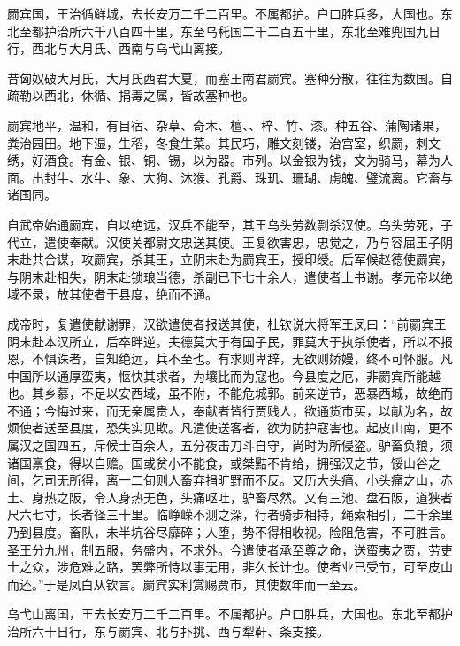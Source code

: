 \documentclass[12pt,UTF8]{ctexbook}
\begin{document}
罽宾国，王治循鲜城，去长安万二千二百里。不属都护。户口胜兵多，大国也。东北至都护治所六千八百四十里，东至乌秅国二千二百五十里，东北至难兜国九日行，西北与大月氏、西南与乌弋山离接。



昔匈奴破大月氏，大月氏西君大夏，而塞王南君罽宾。塞种分散，往往为数国。自疏勒以西北，休循、捐毒之属，皆故塞种也。



罽宾地平，温和，有目宿、杂草、奇木、檀、、梓、竹、漆。种五谷、蒲陶诸果，粪治园田。地下湿，生稻，冬食生菜。其民巧，雕文刻镂，治宫室，织罽，刺文绣，好酒食。有金、银、铜、锡，以为器。市列。以金银为钱，文为骑马，幕为人面。出封牛、水牛、象、大狗、沐猴、孔爵、珠玑、珊瑚、虏魄、璧流离。它畜与诸国同。



自武帝始通罽宾，自以绝远，汉兵不能至，其王乌头劳数剽杀汉使。乌头劳死，子代立，遣使奉献。汉使关都尉文忠送其使。王复欲害忠，忠觉之，乃与容屈王子阴末赴共合谋，攻罽宾，杀其王，立阴末赴为罽宾王，授印绶。后军候赵德使罽宾，与阴末赴相失，阴末赴锁琅当德，杀副已下七十余人，遣使者上书谢。孝元帝以绝域不录，放其使者于县度，绝而不通。



成帝时，复遣使献谢罪，汉欲遣使者报送其使，杜钦说大将军王凤曰：“前罽宾王阴末赴本汉所立，后卒畔逆。夫德莫大于有国子民，罪莫大于执杀使者，所以不报恩，不惧诛者，自知绝远，兵不至也。有求则卑辞，无欲则娇嫚，终不可怀服。凡中国所以通厚蛮夷，惬快其求者，为壤比而为寇也。今县度之厄，非罽宾所能越也。其乡慕，不足以安西域，虽不附，不能危城郭。前亲逆节，恶暴西城，故绝而不通；今悔过来，而无亲属贵人，奉献者皆行贾贱人，欲通货市买，以献为名，故烦使者送至县度，恐失实见欺。凡遣使送客者，欲为防护寇害也。起皮山南，更不属汉之国四五，斥候士百余人，五分夜击刀斗自守，尚时为所侵盗。驴畜负粮，须诸国禀食，得以自赡。国或贫小不能食，或桀黠不肯给，拥强汉之节，馁山谷之间，乞司无所得，离一二旬则人畜弃捐旷野而不反。又历大头痛、小头痛之山，赤土、身热之阪，令人身热无色，头痛呕吐，驴畜尽然。又有三池、盘石阪，道狭者尺六七寸，长者径三十里。临峥嵘不测之深，行者骑步相持，绳索相引，二千余里乃到县度。畜队，未半坑谷尽靡碎；人堕，势不得相收视。险阻危害，不可胜言。圣王分九州，制五服，务盛内，不求外。今遣使者承至尊之命，送蛮夷之贾，劳吏士之众，涉危难之路，罢弊所恃以事无用，非久长计也。使者业已受节，可至皮山而还。”于是凤白从钦言。罽宾实利赏赐贾市，其使数年而一至云。



乌弋山离国，王去长安万二千二百里。不属都护。户口胜兵，大国也。东北至都护治所六十日行，东与罽宾、北与扑挑、西与犁靬、条支接。
\end{document}
